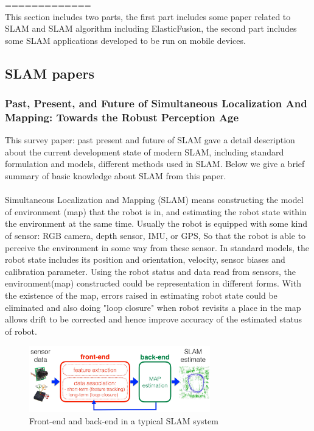 \documentclass[12pt,twoside]{article}
\begin{document}
=============\\

This section includes two parts, the first part includes some paper related to SLAM and SLAM algorithm including ElasticFusion, the second part includes some SLAM applications developed to be run on mobile devices.\\

\subsection{SLAM papers}


\subsubsection{Past, Present, and Future of Simultaneous Localization And Mapping: Towards the Robust Perception Age}
This survey paper: past present and future of SLAM \cite{cadena2016past} gave a detail description about the current development state of modern SLAM, including standard formulation and models, different methods used in SLAM. Below we give a brief summary of basic knowledge about SLAM from this paper.\\
\\
Simultaneous Localization and Mapping (SLAM) means constructing the model of environment (map) that the robot is in, and estimating the robot state within the environment at the same time. Usually the robot is equipped with some kind of sensor: RGB camera, depth sensor, IMU, or GPS, So that the robot is able to perceive the environment in some way from these sensor. In standard models, the robot state includes its position and orientation, velocity, sensor biases and calibration parameter. Using the robot status and  data read from sensors, the environment(map) constructed could be representation in different forms. With the existence of the map, errors raised in estimating robot state could be eliminated and also doing "loop closure" when robot revisits a place in the map allows drift to be corrected and hence improve accuracy of the estimated status of robot.\\
\begin{figure}[h]
    \centering
    \includegraphics[width=0.7\textwidth]{figures/slamStructure}
    \caption{Front-end and back-end in a typical SLAM system\cite{cadena2016past}}
    \label{fig:slamStructure}
\end{figure}
\end{document}
